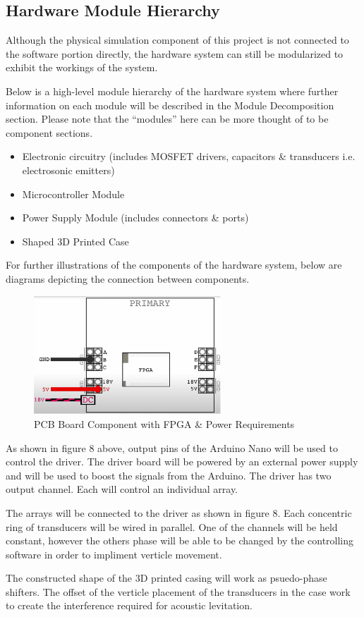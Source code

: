\documentclass[12pt, titlepage]{article}
\begin{document}
\subsection{Hardware Module Hierarchy}
Although the physical simulation component of this project is not connected to the software portion directly, the hardware system can still be modularized to exhibit the workings of the system.
\par 
Below is a high-level module hierarchy of the hardware system where further information on each module will be described in the Module Decomposition section. Please note that the “modules” here can be more thought of to be component sections.
\par

\begin{itemize}
  \item Electronic circuitry (includes MOSFET drivers, capacitors \& transducers i.e. electrosonic emitters)
  \item Microcontroller Module
  \item Power Supply Module (includes connectors \& ports)
  \item Shaped 3D Printed Case
\end{itemize}

For further illustrations of the components of the hardware system, below are diagrams depicting the connection between components.
\par 

\begin{figure}[htp]
  \centering
  \includegraphics[width=7cm]{images/Figure8.png}
  \caption[PCB and Power]{PCB Board Component with FPGA \& Power Requirements}
  \label{fig:figure8}
\end{figure}

As shown in figure 8 above, output pins of the Arduino Nano will be used to control the driver. The driver board will be powered by an external power supply and will be used to boost the signals from the Arduino. The driver has two output channel. Each will control an individual array.
\par 
The arrays will be connected to the driver as shown in figure 8. Each concentric ring of transducers will be wired in parallel. One of the channels will be held constant, however the others phase will be able to be changed by the controlling software in order to impliment verticle movement.
\par
The constructed shape of the 3D printed casing will work as psuedo-phase shifters. The offset of the verticle placement of the transducers in the case work to create the interference required for acoustic levitation. 
\end{document}

